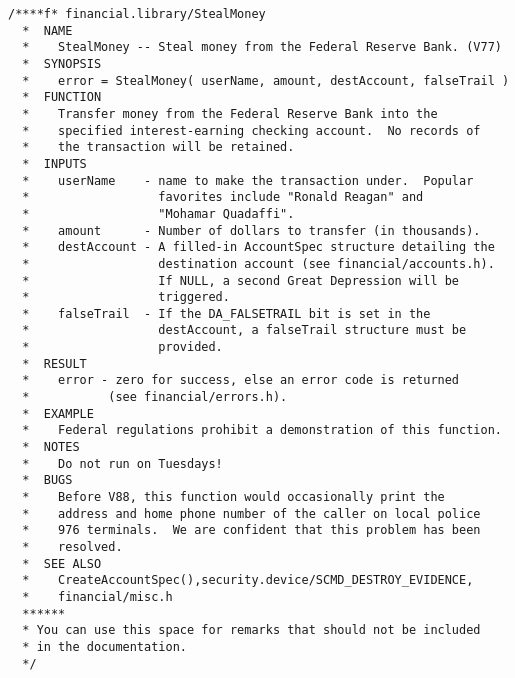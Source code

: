 \begin{verbatim}
/****f* financial.library/StealMoney
  *  NAME
  *    StealMoney -- Steal money from the Federal Reserve Bank. (V77)
  *  SYNOPSIS
  *    error = StealMoney( userName, amount, destAccount, falseTrail )
  *  FUNCTION
  *    Transfer money from the Federal Reserve Bank into the
  *    specified interest-earning checking account.  No records of
  *    the transaction will be retained.
  *  INPUTS
  *    userName    - name to make the transaction under.  Popular
  *                  favorites include "Ronald Reagan" and
  *                  "Mohamar Quadaffi".
  *    amount      - Number of dollars to transfer (in thousands).
  *    destAccount - A filled-in AccountSpec structure detailing the
  *                  destination account (see financial/accounts.h).
  *                  If NULL, a second Great Depression will be
  *                  triggered.
  *    falseTrail  - If the DA_FALSETRAIL bit is set in the
  *                  destAccount, a falseTrail structure must be
  *                  provided.
  *  RESULT
  *    error - zero for success, else an error code is returned
  *           (see financial/errors.h).
  *  EXAMPLE
  *    Federal regulations prohibit a demonstration of this function.
  *  NOTES
  *    Do not run on Tuesdays!
  *  BUGS
  *    Before V88, this function would occasionally print the
  *    address and home phone number of the caller on local police
  *    976 terminals.  We are confident that this problem has been
  *    resolved.
  *  SEE ALSO
  *    CreateAccountSpec(),security.device/SCMD_DESTROY_EVIDENCE,
  *    financial/misc.h
  ******
  * You can use this space for remarks that should not be included
  * in the documentation.
  */
\end{verbatim}

